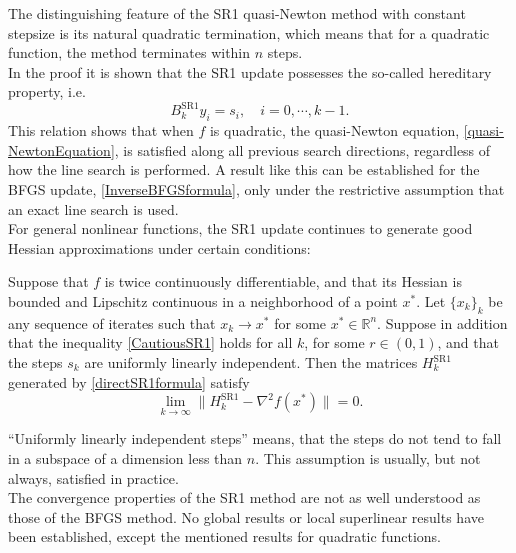 The distinguishing feature of the SR1 quasi-Newton method with constant stepsize is its natural quadratic termination, which means that for a quadratic function, the method terminates within $n$ steps. \\
In the proof it is shown that the SR1 update possesses the so-called hereditary property, i.e. 
\begin{equation}\label{HereditaryProperty}
    B^{\mathrm{SR1}}_k y_i = s_i, \quad i = 0, \cdots, k-1.
\end{equation}
This relation shows that when $f$ is quadratic, the quasi-Newton equation, \cref{quasi-NewtonEquation}, is satisfied along all previous search directions, regardless of how the line search is performed. A result like this can be established for the BFGS update, \cref{InverseBFGSformula}, only under the restrictive assumption that an exact line search is used. \\
For general nonlinear functions, the SR1 update continues to generate good Hessian approximations under certain conditions:
\begin{theorem}
    Suppose that $f$ is twice continuously differentiable, and that its Hessian is bounded and Lipschitz continuous in a neighborhood of a point $x^{*}$. Let $\{x_k\}_k$ be any sequence of iterates such that $x_k \rightarrow x^{*}$ for some $x^{*} \in \mathbb{R}^n$. Suppose in addition that the inequality \cref{CautiousSR1} holds for all $k$, for some $r \in (0,1)$, and that the steps $s_k$ are uniformly linearly independent. Then the matrices $H^{\mathrm{SR1}}_k$ generated by \cref{directSR1formula} satisfy
    \begin{equation*}
        \lim_{k \to \infty} \lVert H^{\mathrm{SR1}}_k - \nabla^2 f(x^{*}) \rVert = 0.
    \end{equation*}
\end{theorem}

“Uniformly linearly independent steps” means, that the steps do not tend to fall in a subspace of a dimension less than $n$. This assumption is usually, but not always, satisfied in practice. \\
The convergence properties of the SR1 method are not as well understood as those of the BFGS method. No global results or local superlinear results have been established, except the mentioned results for quadratic functions.

